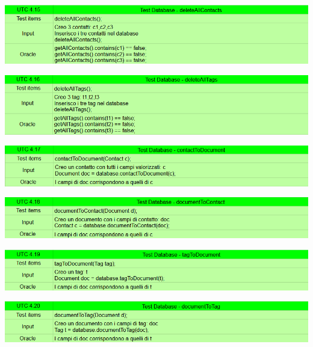 \begin{center} \includegraphics[width=\linewidth]{images/UTC/4-15.png} \end{center}
\begin{center} \includegraphics[width=\linewidth]{images/UTC/4-16.png} \end{center}
\begin{center} \includegraphics[width=\linewidth]{images/UTC/4-17.png} \end{center}
\begin{center} \includegraphics[width=\linewidth]{images/UTC/4-18.png} \end{center}
\begin{center} \includegraphics[width=\linewidth]{images/UTC/4-19.png} \end{center}
\begin{center} \includegraphics[width=\linewidth]{images/UTC/4-20.png} \end{center}
